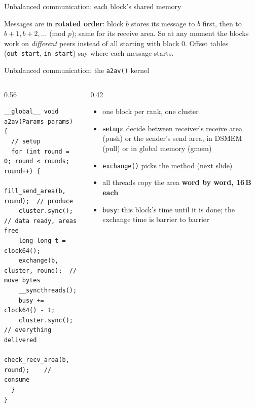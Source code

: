 \documentclass[aspectratio=169, numbering=fraction]{beamer}
\begin{document}
\begin{frame}{Unbalanced communication: each block's shared memory}
  \raggedright
  \scriptsize
  Messages are in \textbf{rotated order}: block $b$ stores its message to $b$ first, then to
  $b{+}1, b{+}2, \dots$ (mod $p$); same for its receive area. So at any moment the blocks work on
  \emph{different} peers instead of all starting with block 0. Offset tables
  (\texttt{out\_start}, \texttt{in\_start}) say where each message starts.
\end{frame}

\begin{frame}[fragile]{Unbalanced communication: the \texttt{a2av()} kernel}
  \footnotesize
  \begin{columns}[c,onlytextwidth]
    \begin{column}{0.56\textwidth}
\begin{verbatim}
__global__ void a2av(Params params) {
  // setup
  for (int round = 0; round < rounds; round++) {
    fill_send_area(b, round);  // produce
    cluster.sync();      // data ready, areas free
    long long t = clock64();
    exchange(b, cluster, round);  // move bytes
    __syncthreads();
    busy += clock64() - t;
    cluster.sync();      // everything delivered
    check_recv_area(b, round);    // consume
  }
}
\end{verbatim}
    \end{column}
    \begin{column}{0.42\textwidth}
      \scriptsize
      \begin{itemize}\itemsep3pt
        \item one block per rank, one cluster
        \item \textbf{setup}: decide between receiver's receive area (push) or the sender's
              send area, in DSMEM (pull) or in global memory (gmem)
        \item \texttt{exchange()} picks the method (next slide)
        \item all threads copy the area \textbf{word by word, 16\,B each}
        \item \texttt{busy}: this block's time until it is done; the exchange time is
              barrier to barrier
      \end{itemize}
    \end{column}
  \end{columns}
\end{frame}
\end{document}
